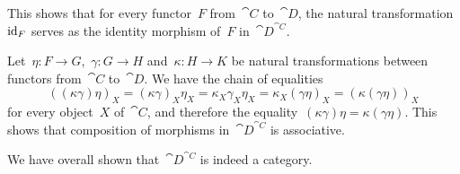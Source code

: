 This shows that for every functor~$F$ from~$\cat{C}$ to~$\cat{D}$, the natural transformation~$\operatorname{id}_F$ serves as the identity morphism of~$F$ in~$\cat{D}^{\cat{C}}$.

Let~$η \colon F \to G$,~$γ \colon G \to H$ and~$κ \colon H \to K$ be natural transformations between functors from~$\cat{C}$ to~$\cat{D}$.
We have the chain of equalities
\[
	((κ γ) η)_X
	=
	(κ γ)_X η_X
	=
	κ_X γ_X η_X
	=
	κ_X (γ η)_X
	=
	(κ (γ η))_X
\]
for every object~$X$ of~$\cat{C}$, and therefore the equality~$(κ γ) η = κ (γ η)$.
This shows that composition of morphisms in~$\cat{D}^{\cat{C}}$ is associative.

We have overall shown that~$\cat{D}^{\cat{C}}$ is indeed a category.
